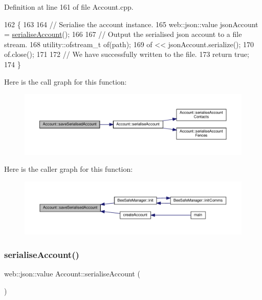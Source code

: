 Definition at line 161 of file Account.\+cpp.


\begin{DoxyCode}
162 \{
163 
164     \textcolor{comment}{// Serialise the account instance.}
165     web::json::value jsonAccount = \hyperlink{class_account_a1e9b184e8a6ddf67e8814e6c575f657e}{serialiseAccount}();
166 
167     \textcolor{comment}{// Output the serialised json account to a file stream.}
168     utility::ofstream\_t of(path);
169     of << jsonAccount.serialize();
170     of.close();
171 
172     \textcolor{comment}{// We have successfully written to the file.}
173     \textcolor{keywordflow}{return} \textcolor{keyword}{true};
174 \}
\end{DoxyCode}
Here is the call graph for this function\+:\nopagebreak
\begin{figure}[H]
\begin{center}
\leavevmode
\includegraphics[width=350pt]{db/d22/class_account_a9ff3a257536bc933e0a39207bb89243d_cgraph}
\end{center}
\end{figure}
Here is the caller graph for this function\+:\nopagebreak
\begin{figure}[H]
\begin{center}
\leavevmode
\includegraphics[width=350pt]{db/d22/class_account_a9ff3a257536bc933e0a39207bb89243d_icgraph}
\end{center}
\end{figure}
\mbox{\label{class_account_a1e9b184e8a6ddf67e8814e6c575f657e}} 
\subsubsection{\texorpdfstring{serialise\+Account()}{serialiseAccount()}}
{\footnotesize\ttfamily web\+::json\+::value Account\+::serialise\+Account (\begin{DoxyParamCaption}{ }\end{DoxyParamCaption})}

